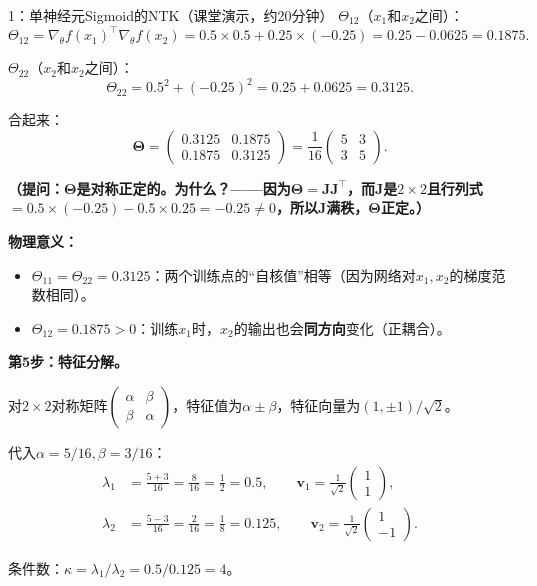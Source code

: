 \documentclass[11pt,a4paper]{article}
\newcommand{\bTheta}{\boldsymbol{\Theta}}
\newcommand{\bJ}{\mathbf{J}}
\newcommand{\bv}{\mathbf{v}}
\begin{document}
\begin{handcalc}{1：单神经元Sigmoid的NTK（课堂演示，约20分钟）}
$\Theta_{12}$（$x_1$和$x_2$之间）：
\[
\Theta_{12} = \nabla_\theta f(x_1)^\top\nabla_\theta f(x_2) = 0.5\times 0.5 + 0.25\times(-0.25) = 0.25 - 0.0625 = 0.1875.
\]

$\Theta_{22}$（$x_2$和$x_2$之间）：
\[
\Theta_{22} = 0.5^2 + (-0.25)^2 = 0.25 + 0.0625 = 0.3125.
\]

合起来：
\[
\boxed{\bTheta = \begin{pmatrix} 0.3125 & 0.1875 \\ 0.1875 & 0.3125 \end{pmatrix} = \frac{1}{16}\begin{pmatrix} 5 & 3 \\ 3 & 5 \end{pmatrix}.}
\]

\textbf{（提问：$\bTheta$是对称正定的。为什么？——因为$\bTheta=\bJ\bJ^\top$，而$\bJ$是$2\times 2$且行列式$=0.5\times(-0.25)-0.5\times 0.25 = -0.25\neq 0$，所以$\bJ$满秩，$\bTheta$正定。）}

\textbf{物理意义：}
\begin{itemize}[leftmargin=*]
\item $\Theta_{11}=\Theta_{22}=0.3125$：两个训练点的``自核值''相等（因为网络对$x_1,x_2$的梯度范数相同）。
\item $\Theta_{12}=0.1875 > 0$：训练$x_1$时，$x_2$的输出也会\textbf{同方向}变化（正耦合）。
\end{itemize}

\bigskip
\textbf{第5步：特征分解。}

对$2\times 2$对称矩阵$\begin{pmatrix}\alpha&\beta\\\beta&\alpha\end{pmatrix}$，特征值为$\alpha\pm\beta$，特征向量为$(1,\pm 1)/\sqrt{2}$。

代入$\alpha=5/16, \beta=3/16$：
\begin{align}
\lambda_1 &= \frac{5+3}{16} = \frac{8}{16} = \frac{1}{2} = 0.5, \qquad \bv_1 = \frac{1}{\sqrt{2}}\begin{pmatrix}1\\1\end{pmatrix}, \\[6pt]
\lambda_2 &= \frac{5-3}{16} = \frac{2}{16} = \frac{1}{8} = 0.125, \qquad \bv_2 = \frac{1}{\sqrt{2}}\begin{pmatrix}1\\-1\end{pmatrix}.
\end{align}

条件数：$\kappa = \lambda_1/\lambda_2 = 0.5/0.125 = 4$。


\end{handcalc}
\end{document}
